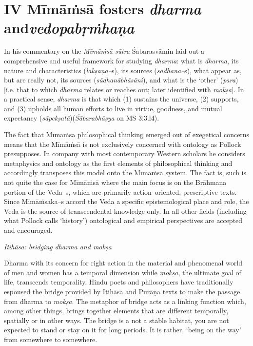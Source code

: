 \section*{IV Mīmāṁsā fosters \textit{dharma} and\hfill \break \textit{vedopabṛṁhaṇa}}

In his commentary on the \textit{Mīmāṁsā sūtra} Śabarasvāmin laid out a comprehensive and useful framework for studying \textit{dharma}: what is \textit{dharma}, its nature and characteristics (\textit{lakṣaṇa–}s), its sources (\textit{sādhana–}s), what appear as, but are really not, its sources (\textit{sādhanābhāsāni}), and what is the ‘other’ (\textit{para}) [i.e. that to which \textit{dharma} relates or reaches out; later identified with \textit{mokṣa}]. In a practical sense, \textit{dharma} is that which (1) sustains the universe, (2) supports, and (3) upholds all human efforts to live in virtue, goodness, and mutual expectancy (\textit{sāpekṣatā})(\textit{Śābarabhāṣya} on MS 3:3.l4).

The fact that Mīmāṁsā philosophical thinking emerged out of exegetical concerns means that the Mīmāṁsā is not exclusively concerned with ontology as Pollock presupposes. In company with most contemporary Western scholars he considers metaphysics and ontology as the first elements of philosophical thinking and accordingly transposes this model onto the Mīmāṁsā system. The fact is, such is not quite the case for Mīmāṁsā where the main focus is on the Brāhmaṇa portion of the Veda–s, which are primarily action–oriented, prescriptive texts. Since Mīmāṁsaka–s accord the Veda a specific epistemological place and role, the Veda is the source of transcendental knowledge only. In all other fields (including what Pollock calls ‘history’) ontological and empirical perspectives are accepted and encouraged. 

\textit{Itihāsa: bridging dharma and mokṣa}

Dharma with its concern for right action in the material and phenomenal world of men and women has a temporal dimension while \textit{mokṣa}, the ultimate goal of life, transcends temporality. Hindu poets and philosophers have traditionally espoused the bridge provided by Itihāsa and Purāṇa texts to make the passage from dharma to \textit{mokṣa}. The metaphor of bridge acts as a linking function which, among other things, brings together elements that are different temporally, spatially or in other ways. The bridge is a not a stable habitat, you are not expected to stand or stay on it for long periods. It is rather, ‘being on the way’ from somewhere to somewhere.

